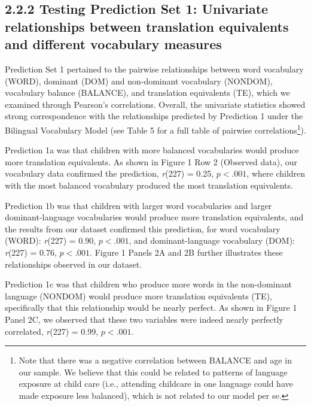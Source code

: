 \documentclass[
  english,
  ,man,floatsintext]{apa6}
\begin{document}
\hypertarget{testing-prediction-set-1-univariate-relationships-between-translation-equivalents-and-different-vocabulary-measures}{%
\subsection{2.2.2 Testing Prediction Set 1: Univariate relationships between translation equivalents and different vocabulary measures}\label{testing-prediction-set-1-univariate-relationships-between-translation-equivalents-and-different-vocabulary-measures}}

Prediction Set 1 pertained to the pairwise relationships between word vocabulary (WORD), dominant (DOM) and non-dominant vocabulary (NONDOM), vocabulary balance (BALANCE), and translation equivalents (TE), which we examined through Pearson's correlations. Overall, the univariate statistics showed strong correspondence with the relationships predicted by Prediction 1 under the Bilingual Vocabulary Model (see Table 5 for a full table of pairwise correlations\footnote{Note that there was a negative correlation between BALANCE and age in our sample. We believe that this could be related to patterns of language exposure at child care (i.e., attending childcare in one language could have made exposure less balanced), which is not related to our model per se.}).

Prediction 1a was that children with more balanced vocabularies would produce more translation equivalents. As shown in Figure 1 Row 2 (Observed data), our vocabulary data confirmed the prediction, \emph{r}(227) = 0.25, \(p < .001\), where children with the most balanced vocabulary produced the most translation equivalents.

Prediction 1b was that children with larger word vocabularies and larger dominant-language vocabularies would produce more translation equivalents, and the results from our dataset confirmed this prediction, for word vocabulary (WORD): \emph{r}(227) = 0.90, \(p < .001\), and dominant-language vocabulary (DOM): \emph{r}(227) = 0.76, \(p < .001\). Figure 1 Panels 2A and 2B further illustrates these relationships observed in our dataset.

Prediction 1c was that children who produce more words in the non-dominant language (NONDOM) would produce more translation equivalents (TE), specifically that this relationship would be nearly perfect. As shown in Figure 1 Panel 2C, we observed that these two variables were indeed nearly perfectly correlated, \emph{r}(227) = 0.99, \(p < .001\).
\end{document}
